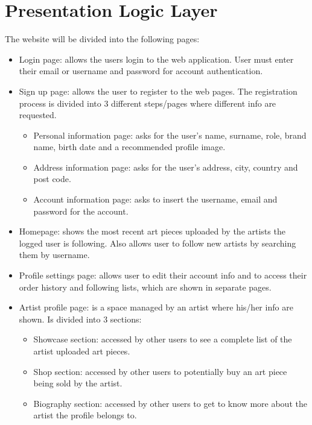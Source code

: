 \section{Presentation Logic Layer}


The website will be divided into the following pages:
\begin{itemize}
    \item Login page: allows the users login to the web application. User must enter their email or username and password for account authentication.
    \item Sign up page: allows the user to register to the web pages. The registration process is divided into 3 different steps/pages where different
    info are requested.
    \begin{itemize}
        \item Personal information page: asks for the user's name, surname, role, brand name, birth date and a recommended profile image.
        \item Address information page: asks for the user's address, city, country and post code.
        \item Account information page: asks to insert the username, email and password for the account.
    \end{itemize}
    \item Homepage: shows the most recent art pieces uploaded by the artists the logged user is following. Also 
    allows user to follow new artists by searching them by username.
    \item Profile settings page: allows user to edit their account info and to access their order history and following 
    lists, which are shown in separate pages.
    \item Artist profile page: is a space managed by an artist where his/her info are shown. Is divided into 3 sections:
    \begin{itemize}
        \item Showcase section: accessed by other users to see a complete list of the artist uploaded art pieces.
        \item Shop section: accessed by other users to potentially buy an art piece being sold by the artist.
        \item Biography section: accessed by other users to get to know more about the artist the profile belongs to.
    \end{itemize}

\end{itemize}

